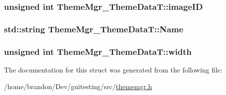 \hypertarget{struct_theme_mgr___theme_data_t_9595a69b11a056d1bb0b807335bc1a8f}{
\subsubsection[{imageID}]{\setlength{\rightskip}{0pt plus 5cm}unsigned int {\bf ThemeMgr\_\-ThemeDataT::imageID}}}
\label{struct_theme_mgr___theme_data_t_9595a69b11a056d1bb0b807335bc1a8f}


\hypertarget{struct_theme_mgr___theme_data_t_9de4d61590462a57142505e40ea55f62}{
\subsubsection[{Name}]{\setlength{\rightskip}{0pt plus 5cm}std::string {\bf ThemeMgr\_\-ThemeDataT::Name}}}
\label{struct_theme_mgr___theme_data_t_9de4d61590462a57142505e40ea55f62}


\hypertarget{struct_theme_mgr___theme_data_t_178e885bbcb6aff2623c72739b130cb8}{
\subsubsection[{width}]{\setlength{\rightskip}{0pt plus 5cm}unsigned int {\bf ThemeMgr\_\-ThemeDataT::width}}}
\label{struct_theme_mgr___theme_data_t_178e885bbcb6aff2623c72739b130cb8}




The documentation for this struct was generated from the following file:\begin{CompactItemize}
\item 
/home/brandon/Dev/guitesting/src/\hyperlink{thememgr_8h}{thememgr.h}\end{CompactItemize}
